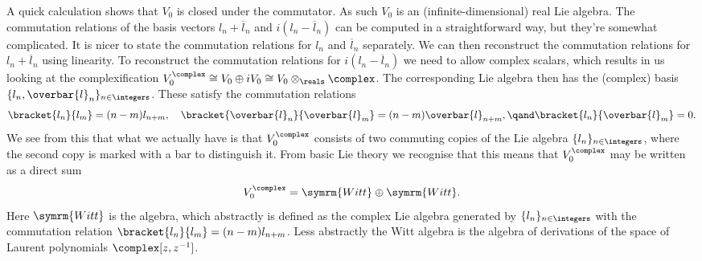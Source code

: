 \documentclass[fleqn]{NotesClass}
\newcommand{\isomorphic}{\cong}
\newcommand{\Witt}{\symrm{Witt}}
\begin{document}
    A quick calculation shows that \(V_0\) is closed under the commutator.
    As such \(V_0\) is an (infinite-dimensional) real Lie algebra.
    The commutation relations of the basis vectors \(l_n + \overbar{l}_n\) and \(i(l_n - \overbar{l}_n)\) can be computed in a straightforward way, but they're somewhat complicated.
    It is nicer to state the commutation relations for \(l_n\) and \(\overbar{l}_n\) separately.
    We can then reconstruct the commutation relations for \(l_n + \overbar{l}_n\) using linearity.
    To reconstruct the commutation relations for \(i(l_n - \overbar{l}_n)\) we need to allow complex scalars, which results in us looking at the complexification \(V_0^{\complex} \isomorphic V_0 \oplus iV_0 \isomorphic V_0 \otimes_{\reals} \complex\).
    The corresponding Lie algebra then has the (complex) basis \(\{l_n, \overbar{l}_n\}_{n \in \integers}\).
    These satisfy the commutation relations
    \begin{equation}
        \bracket{l_n}{l_m} = (n - m)l_{n + m}, \quad \bracket{\overbar{l}_n}{\overbar{l}_m} = (n - m) \overbar{l}_{n + m}, \qand \bracket{l_n}{\overbar{l}_m} = 0.
    \end{equation}
    We see from this that what we actually have is that \(V_0^{\complex}\) consists of two commuting copies of the Lie algebra \(\{l_n\}_{n \in \integers}\), where the second copy is marked with a bar to distinguish it.
    From basic Lie theory we recognise that this means that \(V_0^{\complex}\) may be written as a direct sum
    \begin{equation}
        V_0^{\complex} = \Witt \oplus \Witt.
    \end{equation}
    Here \(\Witt\) is the  algebra, which abstractly is defined as the complex Lie algebra generated by \(\{l_n\}_{n \in \integers}\) with the commutation relation \(\bracket{l_n}{l_m} = (n - m)l_{n + m}\).
    Less abstractly the Witt algebra is the algebra of derivations of the space of Laurent polynomials \(\complex[z, z^{-1}]\).
    
\end{document}
